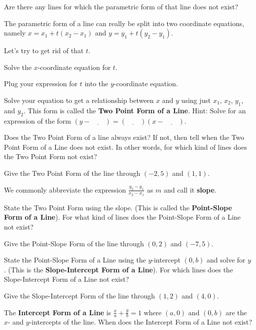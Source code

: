 \bq Are there any lines for which the parametric form of that line does not exist?
\eq



\begin{info} The parametric form of a line can really be split into two coordinate equations, namely $x = x_1+t(x_2-x_1)$ and $y=y_1+t(y_2-y_1)$. \end{info}

\bq\label{q16} Let's try to get rid of that $t$.
\be
\item Solve the $x$-coordinate equation for $t$.
\item Plug your expression for $t$ into the $y$-coordinate equation.
\item Solve your equation to get a relationship between $x$ and $y$ using just $x_1$, $x_2$, $y_1$, and $y_2$. This form is called the \textbf{Two Point Form of a Line}. Hint: Solve for an expression of the form $(y- \underline{\quad \quad} )= (\underline{\quad \quad} )(x- \underline{\quad \quad} )$.
\ee \eq

\bq Does the Two Point Form of a line always exist? If not, then tell when the Two Point Form of a Line does not exist. In other words, for which kind of lines does the Two Point Form not exist?
\eq

\bq Give the Two Point Form of the line through $(-2,5)$ and $(1,1)$.
\eq

\begin{info} We commonly abbreviate the expression $\frac{y_2-y_1}{x_2-x_1}$ as $m$ and call it \textbf{slope}. \end{info}

\bq State the Two Point Form using the slope. (This is called the \textbf{Point-Slope Form of a Line}). For what kind of lines does the Point-Slope Form of a Line not exist?
\eq

\bq Give the Point-Slope Form of the line through $(0,2)$ and $(-7,5)$.
\eq

\bq State the Point-Slope Form of a Line using the $y$-intercept $(0,b)$ and solve for $y$. (This is the \textbf{Slope-Intercept Form of a Line}). For which lines does the Slope-Intercept Form of a Line not exist?
\eq

\bq Give the Slope-Intercept Form of the line through $(1,2)$ and $(4,0)$.
\eq

\bq The \textbf{Intercept Form of a Line} is $\frac{x}{a}+\frac{y}{b} =1$ where $(a,0)$ and $(0,b)$ are the $x$- and $y$-intercepts of the line. When does the Intercept Form of a Line not exist?
\eq

